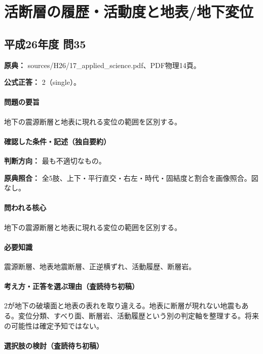 \section{活断層の履歴・活動度と地表/地下変位}

\subsection{平成26年度 問35}
\label{q:h26-reg-applied-35}

\noindent\textbf{原典：} sources/H26/17\_applied\_science.pdf、PDF物理14頁。

\textbf{公式正答：} 2（single）。

\paragraph{問題の要旨} 地下の震源断層と地表に現れる変位の範囲を区別する。

\paragraph{確認した条件・記述（独自要約）}\mbox{}\par

\noindent\textbf{判断方向：} 最も不適切なもの。\par

\noindent\textbf{原典照合：} 全5肢、上下・平行直交・右左・時代・固結度と割合を画像照合。図なし。\par

\paragraph{問われる核心} 地下の震源断層と地表に現れる変位の範囲を区別する。

\paragraph{必要知識} 震源断層、地表地震断層、正逆横ずれ、活動履歴、断層岩。

\paragraph{考え方・正答を選ぶ理由（査読待ち初稿）} 2が地下の破壊面と地表の表れを取り違える。地表に断層が現れない地震もある。変位分類、すべり面、断層岩、活動履歴という別の判定軸を整理する。将来の可能性は確定予知ではない。

\paragraph{選択肢の検討（査読待ち初稿）}\mbox{}\par

